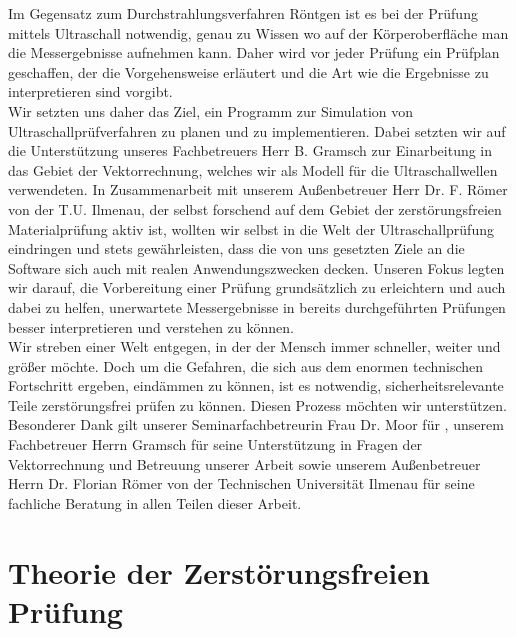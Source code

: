 \documentclass[reducespace,stylepage,semiarbeit]{spezidoc}
\begin{document}
Im Gegensatz zum Durchstrahlungsverfahren Röntgen ist es bei der Prüfung mittels Ultraschall notwendig, genau zu Wissen wo auf der Körperoberfläche man die Messergebnisse aufnehmen kann. Daher wird vor jeder Prüfung ein Prüfplan geschaffen, der die Vorgehensweise erläutert und die Art wie die Ergebnisse zu interpretieren sind vorgibt.\\
Wir setzten uns daher das Ziel, ein Programm zur Simulation von Ultraschallprüfverfahren zu planen und zu implementieren. Dabei setzten wir auf die Unterstützung unseres Fachbetreuers Herr B. Gramsch zur Einarbeitung in das Gebiet der Vektorrechnung, welches wir als Modell für die Ultraschallwellen verwendeten. In Zusammenarbeit mit unserem Außenbetreuer Herr Dr. F. Römer von der T.U. Ilmenau, der selbst forschend auf dem Gebiet der zerstörungsfreien Materialprüfung aktiv ist, wollten wir selbst in die Welt der Ultraschallprüfung eindringen und stets gewährleisten, dass die von uns gesetzten Ziele an die Software sich auch mit realen Anwendungszwecken decken.
Unseren Fokus legten wir darauf, die Vorbereitung einer Prüfung grundsätzlich zu erleichtern und auch dabei zu helfen, unerwartete Messergebnisse in bereits durchgeführten Prüfungen besser interpretieren und verstehen zu können.\\
Wir streben einer Welt entgegen, in der der Mensch immer schneller, weiter und größer möchte. Doch um die Gefahren, die sich aus dem enormen technischen Fortschritt ergeben, eindämmen zu können, ist es notwendig, sicherheitsrelevante Teile zerstörungsfrei prüfen zu können. Diesen Prozess möchten wir unterstützen.
Besonderer Dank gilt unserer Seminarfachbetreurin Frau Dr. Moor für 
, unserem Fachbetreuer Herrn Gramsch für seine Unterstützung in Fragen der Vektorrechnung und Betreuung unserer Arbeit sowie unserem Außenbetreuer Herrn Dr. Florian Römer von der Technischen Universität Ilmenau für seine fachliche Beratung in allen Teilen dieser Arbeit.

\newpage

\section{Theorie der Zerstörungsfreien Prüfung}
\end{document}
